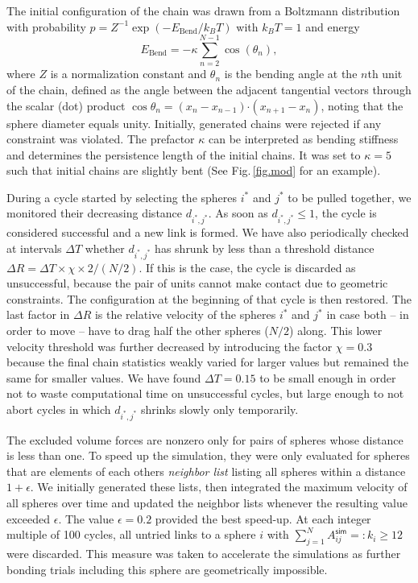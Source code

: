 \documentclass[9pt]{elife}
\begin{document}
The initial configuration of the chain was drawn from a Boltzmann distribution with probability $p=Z^{-1} \exp(-E_{\text{Bend}}/k_BT)$ with $k_BT=1$ and energy 
\begin{equation}
 E_\text{Bend}= -\kappa\sum_{n=2}^{N-1} \cos(\theta_n),
\end{equation}
where $Z$ is a normalization constant and $\theta_n$ is the bending angle at the $n$th unit of the chain, defined as the angle between the adjacent tangential vectors through the scalar (dot) product $\cos{\theta_n}=(x_n-x_{n-1})\boldsymbol{\cdot}(x_{n+1}-x_n)$, noting that the sphere diameter equals unity. Initially, generated chains were rejected if any constraint was violated. The prefactor $\kappa$ can be interpreted as bending stiffness and determines the persistence length of the initial chains. It was set to $\kappa=5$ such that initial chains are slightly bent (See Fig.\,\ref{fig.mod} for an example).

During a cycle started by selecting the spheres $i^*$ and $j^*$ to be pulled together, we monitored their decreasing distance $d_{i^*,j^*}$. As soon as $d_{i^*,j^*}\leq 1$, the cycle is considered successful and a new link is formed. We have also periodically checked at intervals $\Delta T$ whether $d_{i^*,j^*}$ has shrunk by less than a threshold distance $\Delta R=\Delta T\times\chi\times 2/(N/2)$. If this is the case, the cycle is discarded as unsuccessful, because the pair of units cannot make contact due to geometric constraints. The configuration at the beginning of that cycle is then restored. The last factor in $\Delta R$ is the relative velocity of the spheres $i^*$ and $j^*$ in case both -- in order to move -- have to drag half the other spheres ($N/2$) along. This lower velocity threshold was further decreased by introducing the factor $\chi=0.3$ because the final chain statistics weakly varied for larger values but remained the same for smaller values. We have found $\Delta T=0.15$ to be small enough in order not to waste computational time on unsuccessful cycles, but large enough to not abort cycles in which $d_{i^*,j^*}$ shrinks slowly only temporarily.

The excluded volume forces are nonzero only for pairs of spheres whose distance is less than one. To speed up the simulation, they were only evaluated for spheres that are elements of each others \textit{neighbor list} listing all spheres within a distance $1+\epsilon$. We initially generated these lists, then integrated the maximum velocity of all spheres over time and updated the neighbor lists whenever the resulting value exceeded $\epsilon$. The value $\epsilon=0.2$ provided the best speed-up. At each integer multiple of 100 cycles, all untried links to a sphere $i$ with $\sum_{j=1}^{N}A_{ij}^{\textsf{sim}}=:k_i \geq 12$ were discarded. This measure was taken to accelerate the simulations as further bonding trials including this sphere are geometrically impossible. 
\end{document}
